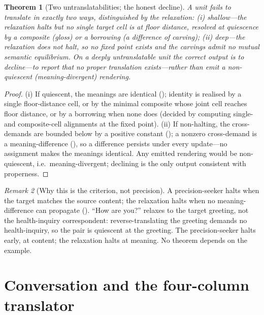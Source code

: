 \documentclass[twocolumn,11pt,a4paper]{article}
\theoremstyle{sup}
\newtheorem{theorem}{Theorem}[section]
\theoremstyle{definition}
\theoremstyle{remark}
\newtheorem{remark}[theorem]{Remark}
\begin{document}
\begin{theorem}[Two untranslatabilities; the honest decline]
\label{thm:two-kinds}
A unit fails to translate in exactly two ways, distinguished by the relaxation:
\textup{(i)} \emph{shallow}---the relaxation halts but no single target cell is
at floor distance, resolved at quiescence by a composite (gloss) or a borrowing
(a difference of carving); \textup{(ii)} \emph{deep}---the relaxation does not
halt, so no fixed point exists and the carvings admit no mutual semantic
equilibrium. On a deeply untranslatable unit the correct output is to
\emph{decline}---to report that no proper translation exists---rather than emit a
non-quiescent (meaning-divergent) rendering.
\end{theorem}

\begin{proof}
(i) If quiescent, the meanings are identical (); identity is
realised by a single floor-distance cell, or by the minimal composite whose joint
cell reaches floor distance, or by a borrowing when none does (decided by
computing single- and composite-cell alignments at the fixed point). (ii) If
non-halting, the cross-demands are bounded below by a positive constant
(); a nonzero cross-demand is a meaning-difference
(), so a difference persists under every update---no
assignment makes the meanings identical. Any emitted rendering would be
non-quiescent, i.e.\ meaning-divergent; declining is the only output consistent
with properness.
\end{proof}

\begin{remark}[Why this is the criterion, not precision]
\label{rem:criterion}
A precision-seeker halts when the target matches the source content; the
relaxation halts when no meaning-difference can propagate ().
``How are you?'' relaxes to the target greeting, not the health-inquiry
correspondent: reverse-translating the greeting demands no health-inquiry, so the
pair is quiescent at the greeting. The precision-seeker halts early, at content;
the relaxation halts at meaning. No theorem depends on the example.
\end{remark}

\part{Conversation and the four-column translator}
\end{document}
